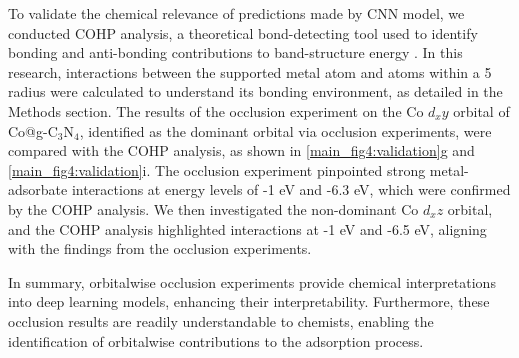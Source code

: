 To validate the chemical relevance of predictions made by CNN model, we conducted COHP analysis, a theoretical bond-detecting tool used to identify bonding and anti-bonding contributions to band-structure energy \cite{deringer2011crystal}.
In this research, interactions between the supported metal atom and atoms within a 5 \text{\AA} radius were calculated to understand its bonding environment, as detailed in the Methods section.
The results of the occlusion experiment on the Co $d_xy$ orbital of Co@g-C$_3$N$_4$, identified as the dominant orbital via occlusion experiments, were compared with the COHP analysis, as shown in \cref{main_fig4:validation}g and \cref{main_fig4:validation}i.
The occlusion experiment pinpointed strong metal-adsorbate interactions at energy levels of -1 eV and -6.3 eV, which were confirmed by the COHP analysis.
We then investigated the non-dominant Co $d_xz$ orbital, and the COHP analysis highlighted interactions at -1 eV and -6.5 eV, aligning with the findings from the occlusion experiments.

In summary, orbitalwise occlusion experiments provide chemical interpretations into deep learning models, enhancing their interpretability.
Furthermore, these occlusion results are readily understandable to chemists, enabling the identification of orbitalwise contributions to the adsorption process.
